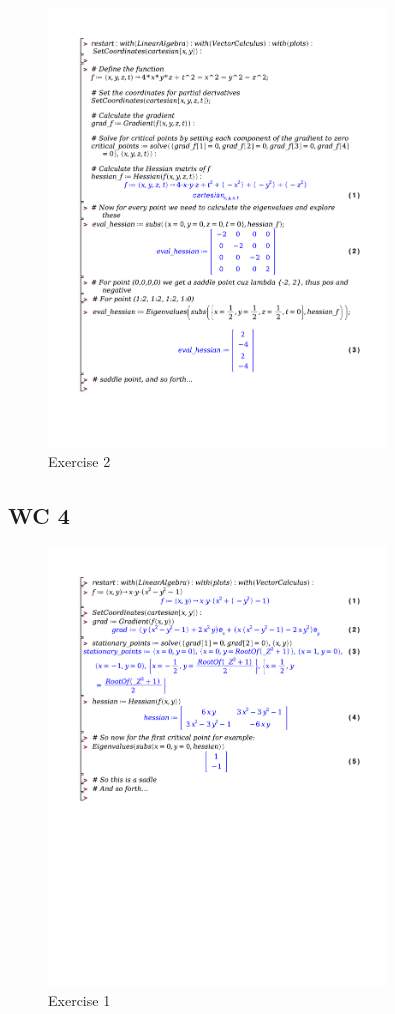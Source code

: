 \documentclass[a4paper]{report}
\begin{document}


\begin{figure}[H]
	\centering
	\includegraphics[width=0.8\textwidth]{exercises/bord_4_ex_2.pdf}
	\caption{Exercise 2}
	\label{fig:bord_4_ex_2}
\end{figure}

\subsection*{WC 4}

\begin{figure}[H]
	\centering
	\includegraphics[width=0.8\textwidth]{exercises/wc_4_ex_1.pdf}
	\caption{Exercise 1}
	\label{fig:word_4_ex_1}
\end{figure}
\end{document}
